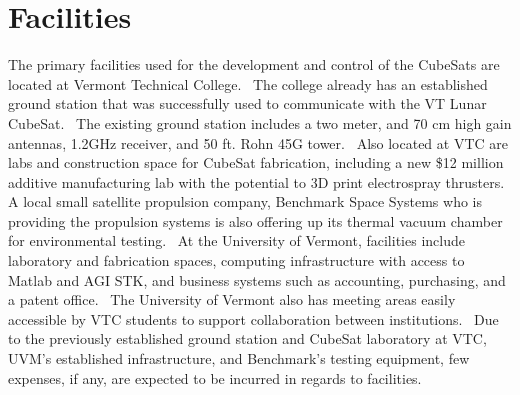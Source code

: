 \section{Facilities}

The primary facilities used for the development and control of the
CubeSats are located at Vermont Technical College.  The college
already has an established ground station that was successfully used
to communicate with the VT Lunar CubeSat.  The existing ground station
includes a two meter, and 70 cm high gain antennas, 1.2GHz receiver,
and 50 ft. Rohn 45G tower.  Also located at VTC are labs and
construction space for CubeSat fabrication, including a new \$12
million additive manufacturing lab with the potential to 3D print
electrospray thrusters.  A local small satellite propulsion company,
Benchmark Space Systems who is providing the propulsion systems is
also offering up its thermal vacuum chamber for environmental
testing.  At the University of Vermont, facilities include laboratory
and fabrication spaces, computing infrastructure with access to Matlab
and AGI STK, and business systems such as accounting, purchasing, and
a patent office.  The University of Vermont also has meeting areas
easily accessible by VTC students to support collaboration between
institutions.  Due to the previously established ground station and
CubeSat laboratory at VTC, UVM’s established infrastructure, and
Benchmark’s testing equipment, few expenses, if any, are expected to
be incurred in regards to facilities.
